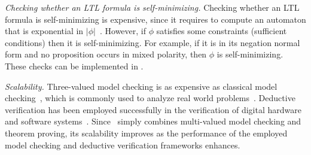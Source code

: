 \emph{Checking whether an LTL formula is self-minimizing.} Checking whether an LTL formula is self-minimizing is expensive, since it requires to compute an automaton that is exponential in $|\phi|$~\cite{godefroid2005MCvsGMC}. 
However, if $\phi$ satisfies some constraints (sufficient conditions) then it is self-minimizing.
For example, if it is in its negation normal form and no proposition occurs in mixed polarity, then $\phi$ is self-minimizing.
These checks can be implemented in \NAME . 

\emph{Scalability.} Three-valued model checking is as expensive as classical model checking~\cite{bruns1999model}, which is commonly used to analyze real world problems~\cite{Woodcock:2009:FMP:1592434.1592436}.
Deductive verification has been employed successfully in the verification of digital hardware and software systems~\cite{rajan1995integration}.
Since \NAME\ simply combines multi-valued model checking and theorem proving, its scalability improves  as the performance of the employed model checking and deductive verification  frameworks enhances.


